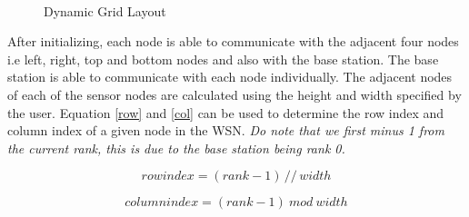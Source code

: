 \documentclass[conference]{IEEEtran}
\begin{document}
	
	\begin{figure}[!t]
		\centering
		\caption{Dynamic Grid Layout}
		\\
		\label{gridlay}
	\end{figure}
	
	
	After initializing, each node is able to communicate with the adjacent four nodes i.e left, right, top and bottom nodes and also with the base station. The base station is able to communicate with each node individually. The adjacent nodes of each of the sensor nodes are calculated using the height and width specified by the user. Equation \ref{row} and \ref{col} can be used to determine the row index and column index of a given node in the WSN. \emph{Do note that we first minus 1 from the current rank, this is due to the base station being rank 0.}
	
	
	\begin{equation}
	row index = (rank - 1) \, // \, width
	\label{row}
	\end{equation}
	
	
	\begin{equation}
	column index = (rank - 1) \ mod \ width
	\label{col}
	\end{equation}
	
\end{document}
